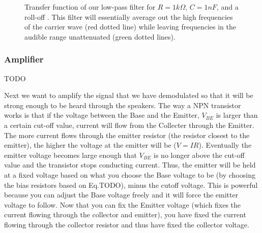 \documentclass[12pt]{article}
\begin{document}
\begin{figure}[H]
\caption{Transfer function of our low-pass filter for $R =1k\Omega$, $C=1nF$, and a roll-off . This filter will essentially average out the high frequencies of the carrier wave (red dotted line) while leaving frequencies in the audible range unattenuated (green dotted lines).}
\label{fig:lowpasstransfer}
\end{figure}

\subsubsection*{Amplifier}
TODO

Next we want to amplify the signal that we have demodulated so that it will be strong enough to be heard through the speakers. The way a NPN transistor works is that if the voltage between the Base and the Emitter, $V_{BE}$ is larger than a certain cut-off value, current will flow from the Collecter through the Emitter. The more current flows through the emitter resistor (the resistor closest to the emitter), the higher the voltage at the emitter will be ($V=IR$). Eventually the emitter voltage becomes large enough that $V_{BE}$ is no longer above the cut-off value and the transistor stops conducting current. Thus, the emitter will be held at a fixed voltage based on what you choose the Base voltage to be (by choosing the bias resistors based on Eq.TODO), minus the cutoff voltage. This is powerful because you can adjust the Base voltage freely and it will force the emitter voltage to follow. Now that you can fix the Emitter voltage (which fixes the current flowing through the collector and emitter), you have fixed the current flowing through the collector resistor and thus have fixed the collector voltage.
\end{document}
